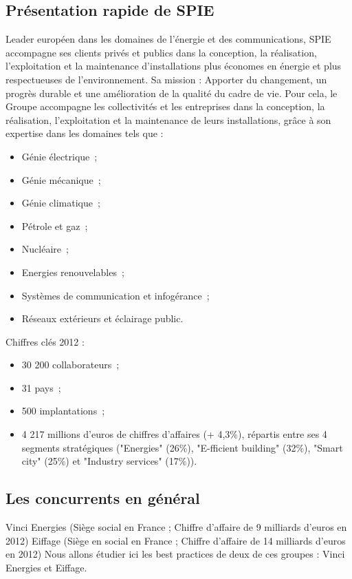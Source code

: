     \subsection{Présentation rapide de SPIE}
    	Leader européen dans les domaines de l'énergie et des communications, SPIE accompagne ses clients privés et publics dans la conception, la réalisation, l'exploitation et la maintenance d'installations plus économes en énergie et plus respectueuses de l'environnement.
    	Sa mission : Apporter du changement, un progrès durable et une amélioration de la qualité du cadre de vie.
    \newpage
    	Pour cela, le Groupe accompagne les collectivités et les entreprises dans la conception, la réalisation, l'exploitation et la maintenance de leurs installations, grâce à son expertise dans les domaines tels que :
    \begin{itemize}
    	\item Génie électrique~;
    	\item Génie mécanique~;
    	\item Génie climatique~;
    	\item Pétrole et gaz~;
    	\item Nucléaire~;
    	\item Energies renouvelables~;
    	\item Systèmes de communication et infogérance~;
    	\item Réseaux extérieurs et éclairage public.
    \end{itemize}
    \bigbreak
    Chiffres clés 2012 :
    \begin{itemize}
    	\item 30 200 collaborateurs~;
    	\item 31 pays~;
    	\item 500 implantations~;
    	\item 4 217 millions d'euros de chiffres d'affaires (+ 4,3\%), répartis entre ses 4 segments stratégiques ("Energies" (26\%), "E-fficient building" (32\%), "Smart city" (25\%) et "Industry services" (17\%)).
    \end{itemize}

    \subsection{Les concurrents en général}
    Vinci Energies (Siège social en France ; Chiffre d'affaire de 9 milliards d’euros en 2012)
    Eiffage (Siège en social en France ; Chiffre d'affaire de 14 milliards d’euros en 2012)
    	Nous allons étudier ici les best practices de deux de ces groupes : Vinci Energies et Eiffage.

